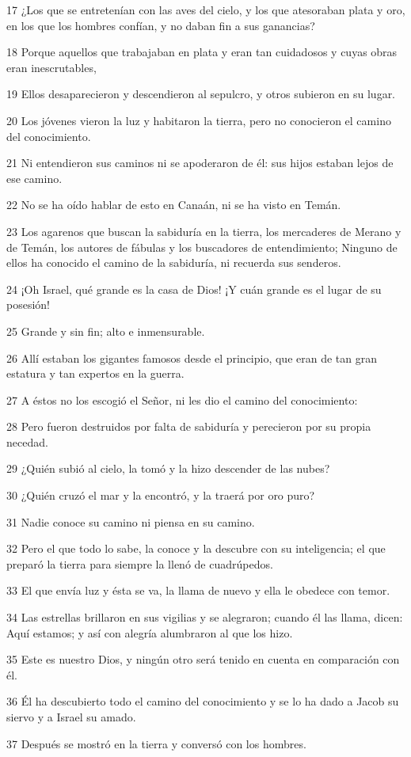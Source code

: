 \par 17 ¿Los que se entretenían con las aves del cielo, y los que atesoraban plata y oro, en los que los hombres confían, y no daban fin a sus ganancias?
\par 18 Porque aquellos que trabajaban en plata y eran tan cuidadosos y cuyas obras eran inescrutables,
\par 19 Ellos desaparecieron y descendieron al sepulcro, y otros subieron en su lugar.
\par 20 Los jóvenes vieron la luz y habitaron la tierra, pero no conocieron el camino del conocimiento.
\par 21 Ni entendieron sus caminos ni se apoderaron de él: sus hijos estaban lejos de ese camino.
\par 22 No se ha oído hablar de esto en Canaán, ni se ha visto en Temán.
\par 23 Los agarenos que buscan la sabiduría en la tierra, los mercaderes de Merano y de Temán, los autores de fábulas y los buscadores de entendimiento; Ninguno de ellos ha conocido el camino de la sabiduría, ni recuerda sus senderos.
\par 24 ¡Oh Israel, qué grande es la casa de Dios! ¡Y cuán grande es el lugar de su posesión!
\par 25 Grande y sin fin; alto e inmensurable.
\par 26 Allí estaban los gigantes famosos desde el principio, que eran de tan gran estatura y tan expertos en la guerra.
\par 27 A éstos no los escogió el Señor, ni les dio el camino del conocimiento:
\par 28 Pero fueron destruidos por falta de sabiduría y perecieron por su propia necedad.
\par 29 ¿Quién subió al cielo, la tomó y la hizo descender de las nubes?
\par 30 ¿Quién cruzó el mar y la encontró, y la traerá por oro puro?
\par 31 Nadie conoce su camino ni piensa en su camino.
\par 32 Pero el que todo lo sabe, la conoce y la descubre con su inteligencia; el que preparó la tierra para siempre la llenó de cuadrúpedos.
\par 33 El que envía luz y ésta se va, la llama de nuevo y ella le obedece con temor.
\par 34 Las estrellas brillaron en sus vigilias y se alegraron; cuando él las llama, dicen: Aquí estamos; y así con alegría alumbraron al que los hizo.
\par 35 Este es nuestro Dios, y ningún otro será tenido en cuenta en comparación con él.
\par 36 Él ha descubierto todo el camino del conocimiento y se lo ha dado a Jacob su siervo y a Israel su amado.
\par 37 Después se mostró en la tierra y conversó con los hombres.

